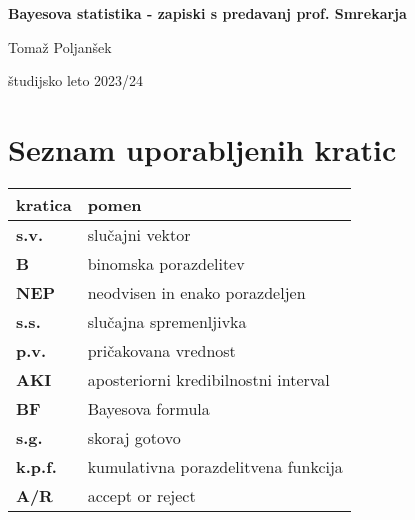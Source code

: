 \documentclass[a4paper, 12pt]{book}
\title{\ttitle}
\author{\tauthor}
\date{\tdate}
\newcommand{\ttitle}{Bayesova statistika - zapiski s predavanj prof. Smrekarja}
\newcommand{\tauthor}{Tomaž Poljanšek}
\newcommand{\tdate}{študijsko leto 2023/24}
\theoremstyle{definition}
\theoremstyle{remark}
\newcommand\mymaketitle{
  \begin{titlepage}
    \begin{center}
        \vspace*{4cm}
        \Huge
        \textbf{\ttitle}
                        
        \vspace{1.5cm}
        \huge
        \tauthor
            
        \vspace{3cm}
        \Large
        \tdate
    \end{center}
  \end{titlepage}
}
\begin{document}
\renewcommand{\thepage}{}
\newcommand{\sn}[1]{"`#1"'}

\mymaketitle

\clearpage
\frontmatter

\pagestyle{empty}
\def\thepage{}
\tableofcontents{}

\def\x{\hspace{3ex}}    %
\def\y{\hspace{2.45ex}}  %
\def\z{\hspace{1.9ex}}    %
\stackMath

\clearpage
{}

\section*{Seznam uporabljenih kratic}

\noindent\begin{tabular}{p{}|p{}}
  {\bf kratica} & {pomen} \\
  \hline
  {\bf s.v.} & {slučajni vektor} \\
  {\bf B} & {binomska porazdelitev} \\
  {\bf NEP} & {neodvisen in enako porazdeljen} \\
  {\bf s.s.} & {slučajna spremenljivka} \\
  {\bf p.v.} & {pričakovana vrednost} \\
  {\bf AKI} & {aposteriorni kredibilnostni interval} \\
  {\bf BF} & {Bayesova formula} \\
  {\bf s.g.} & {skoraj gotovo} \\
  {\bf k.p.f.} & {kumulativna porazdelitvena funkcija} \\
  {\bf A/R} & {accept or reject} \\
\end{tabular}



\mainmatter
\setcounter{page}{1}
\pagestyle{fancy}



\end{document}
